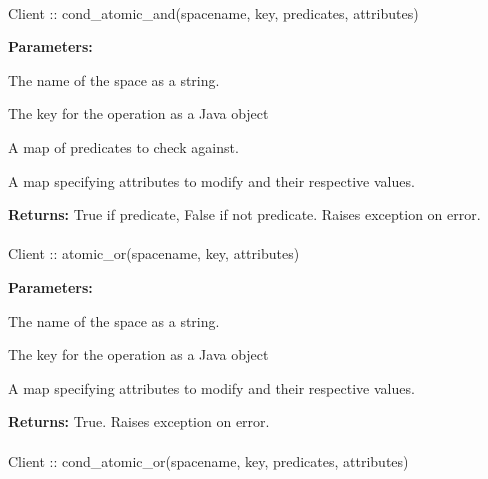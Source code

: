 \paragraph{}
\label{api:java:cond_atomic_and}
\begin{javacode}
Client :: cond_atomic_and(spacename, key, predicates, attributes)
\end{javacode}


\noindent\textbf{Parameters:}
\begin{description}[labelindent=\widthof{{\code{predicates}}},leftmargin=*,noitemsep,nolistsep,align=right]
\item[\code{spacename}] The name of the space as a string.
\item[\code{key}] The key for the operation as a Java object
\item[\code{predicates}] A map of predicates to check against.
\item[\code{attributes}] A map specifying attributes to modify and their respective values.
\end{description}

\noindent\textbf{Returns:}
True if predicate, False if not predicate.  Raises exception on error.

\paragraph{}
\label{api:java:atomic_or}
\begin{javacode}
Client :: atomic_or(spacename, key, attributes)
\end{javacode}


\noindent\textbf{Parameters:}
\begin{description}[labelindent=\widthof{{\code{attributes}}},leftmargin=*,noitemsep,nolistsep,align=right]
\item[\code{spacename}] The name of the space as a string.
\item[\code{key}] The key for the operation as a Java object
\item[\code{attributes}] A map specifying attributes to modify and their respective values.
\end{description}

\noindent\textbf{Returns:}
True.  Raises exception on error.

\paragraph{}
\label{api:java:cond_atomic_or}
\begin{javacode}
Client :: cond_atomic_or(spacename, key, predicates, attributes)
\end{javacode}


